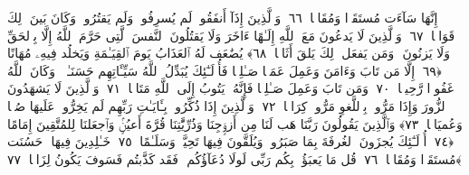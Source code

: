  إِنَّهَا سَآءَت مُستَقَرًّۭا وَمُقَامًۭا ﴿٦٦﴾
 وَٱلَّذِينَ إِذَآ أَنفَقُوا۟ لَم يُسرِفُوا۟ وَلَم يَقتُرُوا۟ وَكَانَ بَينَ ذَٟلِكَ قَوَامًۭا ﴿٦٧﴾
 وَٱلَّذِينَ لَا يَدعُونَ مَعَ ٱللَّهِ إِلَـٰهًا ءَاخَرَ وَلَا يَقتُلُونَ ٱلنَّفسَ ٱلَّتِى حَرَّمَ ٱللَّهُ إِلَّا بِٱلحَقِّ وَلَا يَزنُونَ ۚ وَمَن يَفعَل ذَٟلِكَ يَلقَ أَثَامًۭا ﴿٦٨﴾
 يُضَٰعَف لَهُ ٱلعَذَابُ يَومَ ٱلقِيَـٰمَةِ وَيَخلُد فِيهِۦ مُهَانًا ﴿٦٩﴾
 إِلَّا مَن تَابَ وَءَامَنَ وَعَمِلَ عَمَلًۭا صَـٰلِحًۭا فَأُو۟لَـٰٓئِكَ يُبَدِّلُ ٱللَّهُ سَيِّـَٔاتِهِم حَسَنَـٰتٍۢ ۗ وَكَانَ ٱللَّهُ غَفُورًۭا رَّحِيمًۭا ﴿٧٠﴾
 وَمَن تَابَ وَعَمِلَ صَـٰلِحًۭا فَإِنَّهُۥ يَتُوبُ إِلَى ٱللَّهِ مَتَابًۭا ﴿٧١﴾
 وَٱلَّذِينَ لَا يَشهَدُونَ ٱلزُّورَ وَإِذَا مَرُّوا۟ بِٱللَّغوِ مَرُّوا۟ كِرَامًۭا ﴿٧٢﴾
 وَٱلَّذِينَ إِذَا ذُكِّرُوا۟ بِـَٔايَـٰتِ رَبِّهِم لَم يَخِرُّوا۟ عَلَيهَا صُمًّۭا وَعُميَانًۭا ﴿٧٣﴾
 وَٱلَّذِينَ يَقُولُونَ رَبَّنَا هَب لَنَا مِن أَزوَٟجِنَا وَذُرِّيَّٰتِنَا قُرَّةَ أَعيُنٍۢ وَٱجعَلنَا لِلمُتَّقِينَ إِمَامًا ﴿٧٤﴾
 أُو۟لَـٰٓئِكَ يُجزَونَ ٱلغُرفَةَ بِمَا صَبَرُوا۟ وَيُلَقَّونَ فِيهَا تَحِيَّةًۭ وَسَلَـٰمًا ﴿٧٥﴾
 خَـٰلِدِينَ فِيهَا ۚ حَسُنَت مُستَقَرًّۭا وَمُقَامًۭا ﴿٧٦﴾
 قُل مَا يَعبَؤُا۟ بِكُم رَبِّى لَولَا دُعَآؤُكُم ۖ فَقَد كَذَّبتُم فَسَوفَ يَكُونُ لِزَامًۢا ﴿٧٧﴾
 
